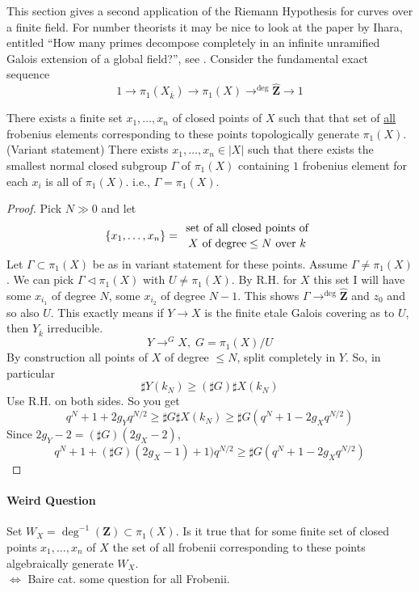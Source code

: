 \noindent
This section gives a second application of the Riemann Hypothesis for
curves over a finite field. For number theorists it may be nice
to look at the paper by Ihara, entitled
``How many primes decompose completely in an infinite unramified Galois
extension of a global field?'', see \cite{Ihara}.
Consider the fundamental exact sequence
	$$1\to \pi_1(X_{\overline k})\to 
\pi_1(X)\to^{\deg}\widehat{\mathbf{Z}}\to 1$$
	\begin{proposition}
	There exists a finite set $x_1, \ldots, x_n$ of closed points of $X$ 
such that that set of \underline{all} frobenius elements corresponding to these 
points topologically generate $\pi_1(X)$. \\
	
\noindent
	(Variant statement) There exists $x_1, \ldots, x_n\in |X|$ such that 
there exists the smallest normal closed subgroup $\Gamma$ of $\pi_1(X)$ 
containing $1$ frobenius element for each $x_i$ is all of $\pi_1(X)$. i.e., 
$\Gamma=\pi_1(X)$.
	\end{proposition}
\begin{proof} Pick $N\gg 0$ and let 
	$$\left\{x_1, \ldots, x_n\right\}={\text{ set of all closed points of 
}\atop X\text{ of degree} \leq N\text{ over } k}$$
	Let $\Gamma\subset \pi_1(X)$ be as in variant statement for these 
points. Assume $\Gamma\neq \pi_1(X)$. We can pick $\Gamma\lhd \pi_1(X)$ with 
$U\neq \pi_1(X)$. By R.H. for $X$ this set I will have some $x_{i_1}$ of degree 
$N$, some $x_{i_2}$ of degree $N-1$. This shows 
$\Gamma\to^{\deg}\widehat{\mathbf{Z}}$ and $z_0$ and so also $U$. This exactly 
means if $Y\to X$ is the finite etale Galois covering as to $U$, then 
$Y_{\overline k}$ irreducible. 
		$$Y\to^G X, \; G = \pi_1(X)/U$$
		By construction all points of $X$ of degree $\leq N$, split 
completely in $Y$. So, in particular 
			$$\sharp Y(k_N)\geq (\sharp G)\sharp X(k_N)$$
			Use R.H. on both sides. So you get
		$$q^N+1+2g_Yq^{N/2}\geq \sharp G\sharp X(k_N)\geq \sharp 
G(q^N+1-2g_Xq^{N/2})$$
		Since $2g_Y-2 = (\sharp G)(2g_X-2)$, 
		$$q^N+1+(\sharp G)(2g_X-1)+1)q^{N/2}\geq \sharp 
G(q^N+1-2g_Xq^{N/2})$$
\end{proof}	

\paragraph{Weird Question} Set $W_X = \deg^{-1}(\mathbf{Z})\subset \pi_1(X)$. 
Is it true that for some finite set of closed points $x_1, \ldots, x_n$ of $X$ 
the set of all frobenii corresponding to these points algebraically generate 
$W_X$. \\
$\iff$ Baire cat. some question for all Frobenii. 


